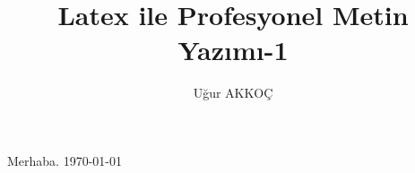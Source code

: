 \documentclass[pdf]{article}
\title{Latex ile Profesyonel Metin Yazımı-1}
\author{Uğur AKKOÇ}
\begin{document}
  
	\maketitle

	
	Merhaba. \today
	
\end{document}
